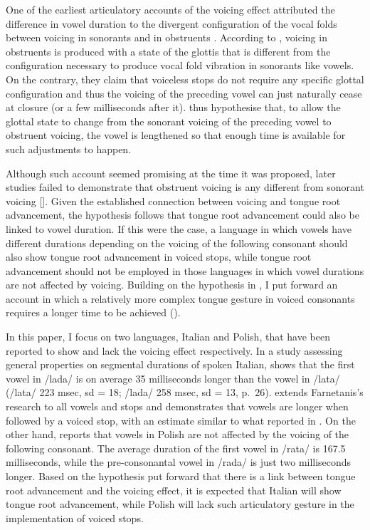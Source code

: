 \documentclass[authoryear, twocolumn]{elsarticle}
\begin{document}
One of the earliest articulatory accounts of the voicing effect
attributed the difference in vowel duration to the divergent
configuration of the vocal folds between voicing in sonorants and in
obstruents \citetext{\citealp{halle1967}; \citealp[reiterated
in][]{chomsky1968}}. According to \citet{halle1967}, voicing in
obstruents is produced with a state of the glottis that is different
from the configuration necessary to produce vocal fold vibration in
sonorants like vowels. On the contrary, they claim that voiceless stops
do not require any specific glottal configuration and thus the voicing
of the preceding vowel can just naturally cease at closure (or a few
milliseconds after it). \citet{halle1967} thus hypothesise that, to
allow the glottal state to change from the sonorant voicing of the
preceding vowel to obstruent voicing, the vowel is lengthened so that
enough time is available for such adjustments to happen.

Although such account seemed promising at the time it was proposed,
later studies failed to demonstrate that obstruent voicing is any
different from sonorant voicing {[}{]}. Given the established connection
between voicing and tongue root advancement, the hypothesis follows that
tongue root advancement could also be linked to vowel duration. If this
were the case, a language in which vowels have different durations
depending on the voicing of the following consonant should also show
tongue root advancement in voiced stops, while tongue root advancement
should not be employed in those languages in which vowel durations are
not affected by voicing. Building on the hypothesis in
\citet{halle1967}, I put forward an account in which a relatively more
complex tongue gesture in voiced consonants requires a longer time to be
achieved ().

In this paper, I focus on two languages, Italian and Polish, that have
been reported to show and lack the voicing effect respectively. In a
study assessing general properties on segmental durations of spoken
Italian, \citet{farnetani1986} shows that the first vowel in /lada/ is
on average 35 milliseconds longer than the vowel in /lata/ (/lata/ 223
msec, sd = 18; /lada/ 258 msec, sd = 13, p.~26). \citet{esposito2002}
extends Farnetanis's research to all vowels and stops and demonstrates
that vowels are longer when followed by a voiced stop, with an estimate
similar to what reported in \citet{farnetani1986}. On the other hand,
\citet{keating1984} reports that vowels in Polish are not affected by
the voicing of the following consonant. The average duration of the
first vowel in /rata/ is 167.5 milliseconds, while the pre-consonantal
vowel in /rada/ is just two milliseconds longer. Based on the hypothesis
put forward that there is a link between tongue root advancement and the
voicing effect, it is expected that Italian will show tongue root
advancement, while Polish will lack such articulatory gesture in the
implementation of voiced stops.
\end{document}
